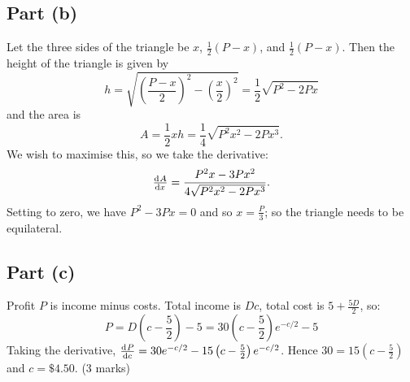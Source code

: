 \documentclass[a4paper]{report}
\begin{document}
\subsection*{Part (b)}
Let the three sides of the triangle be $ x $, $ \frac{1}{2}(P - x) $, and $ \frac{1}{2}(P - x) $. Then the height of the triangle is given by
\begin{displaymath}
  h = \sqrt{\left(\frac{P - x}{2}\right)^2 - \left(\frac{x}{2}\right)^2} = \frac{1}{2}\sqrt{P^2 - 2Px}
\end{displaymath}
and the area is
\begin{displaymath}
  A = \frac{1}{2} xh = \frac{1}{4} \sqrt{P^2 x^2 - 2Px^3}.
\end{displaymath}
We wish to maximise this, so we take the derivative:
\begin{displaymath}
  \od{A}{x} = \frac{P^2 x - 3P x^2}{4\sqrt{P^2 x^2 - 2Px^3}}.
\end{displaymath}
Setting to zero, we have $ P^2 - 3Px = 0 $ and so $ x = \frac{P}{3} $; so the triangle needs to be equilateral.



\subsection*{Part (c)}
Profit $ P $ is income minus costs. Total income is $ Dc $, total cost is $ 5 + \frac{5D}{2} $, so:
\begin{displaymath}
  P = D\left(c - \frac{5}{2}\right) - 5 = 30\left(c - \frac{5}{2}\right)e^{-c/2} - 5
\end{displaymath}
Taking the derivative, $ \od{P}{c} = 30e^{-c/2} - 15\left(c - \frac{5}{2}\right)e^{-c/2} $.
Hence $ 30 = 15(c - \frac{5}{2}) $ and $ c = \$4.50 $. (3 marks)
\end{document}
